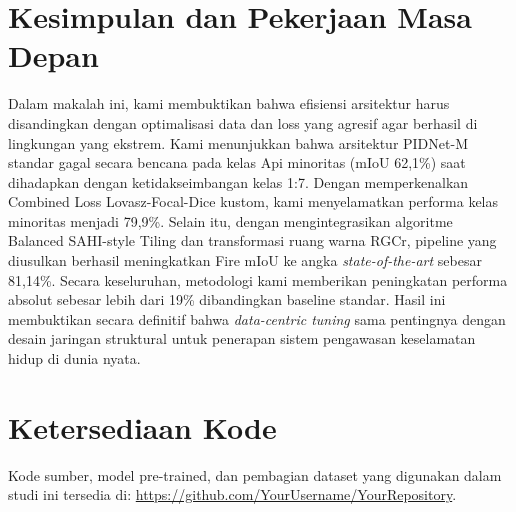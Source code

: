 \documentclass[conference]{IEEEtran}
\begin{document}
\section{Kesimpulan dan Pekerjaan Masa Depan}
Dalam makalah ini, kami membuktikan bahwa efisiensi arsitektur harus disandingkan dengan optimalisasi data dan loss yang agresif agar berhasil di lingkungan yang ekstrem. Kami menunjukkan bahwa arsitektur PIDNet-M standar gagal secara bencana pada kelas Api minoritas (mIoU 62,1\%) saat dihadapkan dengan ketidakseimbangan kelas 1:7. Dengan memperkenalkan Combined Loss Lovasz-Focal-Dice kustom, kami menyelamatkan performa kelas minoritas menjadi 79,9\%. Selain itu, dengan mengintegrasikan algoritme Balanced SAHI-style Tiling dan transformasi ruang warna RGCr, pipeline yang diusulkan berhasil meningkatkan Fire mIoU ke angka \textit{state-of-the-art} sebesar 81,14\%. Secara keseluruhan, metodologi kami memberikan peningkatan performa absolut sebesar lebih dari 19\% dibandingkan baseline standar. Hasil ini membuktikan secara definitif bahwa \textit{data-centric tuning} sama pentingnya dengan desain jaringan struktural untuk penerapan sistem pengawasan keselamatan hidup di dunia nyata.

\section*{Ketersediaan Kode}
Kode sumber, model pre-trained, dan pembagian dataset yang digunakan dalam studi ini tersedia di: \url{https://github.com/YourUsername/YourRepository}.
\end{document}
